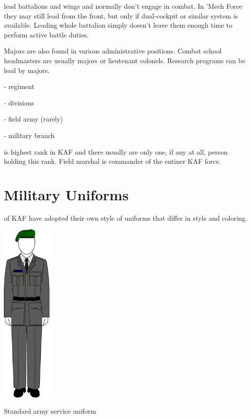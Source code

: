 \documentclass{tufte-book}
\begin{document}
 lead battalions and wings and normally don't engage in
combat. In 'Mech Force they may still lead from the front, but only if
dual-cockpit or similar system is available. Leading whole battalion simply
doesn't leave them enough time to perform active battle duties.

Majors are also found in various administrative positions. Combat school
headmasters are usually majors or lieutenant colonels. Research programs
can be lead by majors.


 - regiment

 - divisions

 - field army (rarely)

 - military branch

  is highest rank in KAF and there
usually are only one, if any at all, person holding this rank. Field marshal
is commander of the entiner KAF force.

\section{Military Uniforms}
\label{sc:military_uniforms}

 of KAF have adopted their own style of
uniforms that differ in style and coloring.

\begin{marginfigure}[0\baselineskip]
  \includegraphics[width=2.5cm]{army_service}
  \caption{Standard army service uniform}
  \label{fig:army_service}
\end{marginfigure}
\end{document}
